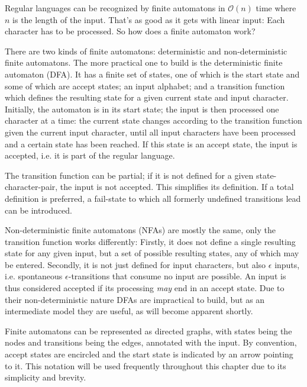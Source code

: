 			Regular languages can be recognized by finite automatons in $\mathcal{O}(n)$ time where $n$ is the length of the input. That's as good as it gets with linear input: Each character has to be processed. So how does a finite automaton work?
			
			
			There are two kinds of finite automatons: deterministic and non-deterministic finite automatons. The more practical one to build is the deterministic finite automaton (DFA). It has a finite set of states, one of which is the start state and some of which are accept states; an input alphabet; and a transition function which defines the resulting state for a given current state and input character. Initially, the automaton is in its start state; the input is then processed one character at a time: the current state changes according to the transition function given the current input character, until all input characters have been processed and a certain state has been reached. If this state is an accept state, the input is accepted, i.e. it is part of the regular language.
			
			The transition function can be partial; if it is not defined for a given state-character-pair, the input is not accepted. This simplifies its definition. If a total definition is preferred, a fail-state to which all formerly undefined transitions lead can be introduced.
			
			Non-deterministic finite automatons (NFAs) are mostly the same, only the transition function works differently: Firstly, it does not define a single resulting state for any given input, but a set of possible resulting states, any of which may be entered. Secondly, it is not just defined for input characters, but also $\epsilon$ inputs, i.e. spontaneous $\epsilon$-transitions that consume no input are possible. An input is thus considered accepted if its processing \textit{may} end in an accept state. Due to their non-deterministic nature DFAs are impractical to build, but as an intermediate model they are useful, as will become apparent shortly.
			
			Finite automatons can be represented as directed graphs, with states being the nodes and transitions being the edges, annotated with the input. By convention, accept states are encircled and the start state is indicated by an arrow pointing to it. This notation will be used frequently throughout this chapter due to its simplicity and brevity.
			
